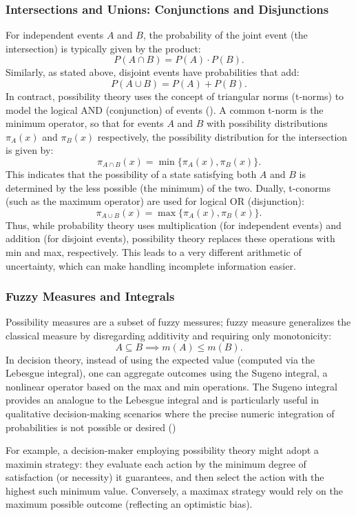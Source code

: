 \documentclass[12pt,a4paper]{report}
\begin{document}
\subsubsection{Intersections and Unions: Conjunctions and Disjunctions}
  
  For independent events \(A\) and \(B\), the probability of the joint event (the intersection) is typically given by the product:
  \[
  P(A \cap B) = P(A) \cdot P(B).
  \]
  Similarly, as stated above, disjoint events have probabilities that add:
  \[
  P(A \cup B) = P(A) + P(B).
  \]
  In contract, possibility theory uses the concept of triangular norms (t-norms) to model the logical AND (conjunction) of events (\cite{DUBOIS01021982}). A common t-norm is the minimum operator, so that for events \(A\) and \(B\) with possibility distributions \( \pi_A(x) \) and \( \pi_B(x) \) respectively, the possibility distribution for the intersection is given by:
  \[
  \pi_{A \cap B}(x) = \min\{ \pi_A(x), \pi_B(x) \}.
  \]
  This indicates that the possibility of a state satisfying both \(A\) and \(B\) is determined by the less possible (the minimum) of the two. Dually, t-conorms (such as the maximum operator) are used for logical OR (disjunction):
  \[
  \pi_{A \cup B}(x) = \max\{ \pi_A(x), \pi_B(x) \}.
  \]
  Thus, while probability theory uses multiplication (for independent events) and addition (for disjoint events), possibility theory replaces these operations with min and max, respectively. This leads to a very different arithmetic of uncertainty, which can make handling incomplete information easier.

\subsubsection{Fuzzy Measures and Integrals}
Possibility measures are a subset of fuzzy messures; fuzzy measure generalizes the classical measure by disregarding additivity and requiring only monotonicity:
\[
A \subseteq B \implies m(A) \leq m(B).
\]
In decision theory, instead of using the expected value (computed via the Lebesgue integral), one can aggregate outcomes using the Sugeno integral, a nonlinear operator based on the max and min operations. The Sugeno integral provides an analogue to the Lebesgue integral and is particularly useful in qualitative decision-making scenarios where the precise numeric integration of probabilities is not possible or desired (\cite{Dubois:2015})
  
For example, a decision-maker employing possibility theory might adopt a maximin strategy: they evaluate each action by the minimum degree of satisfaction (or necessity) it guarantees, and then select the action with the highest such minimum value. Conversely, a maximax strategy would rely on the maximum possible outcome (reflecting an optimistic bias).  
\end{document}
